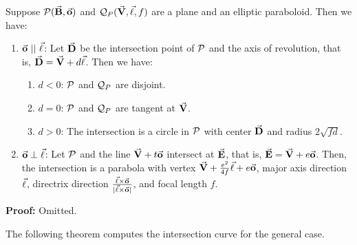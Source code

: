 \begin{lemma}
\label{lemma:para-para&perp}
     Suppose ${\cal P}(\vec{\bf B},\vec{\bf o})$ and
${\cal Q}_P(\vec{\bf V},\vec{\bf \ell},f)$ are a plane and an elliptic paraboloid.
Then we have:
\begin{enumerate}
     \item $\vec{\bf o}\ ||\ \vec{\bf \ell}$:  Let $\vec{\bf D}$ be the intersection
          point of ${\cal P}$ and the axis of revolution, that is,
          $\vec{\bf D}=\vec{\bf V}+d\vec{\bf \ell}$.  Then we have:
     \begin{enumerate}
          \item $d<0$: ${\cal P}$ and ${\cal Q}_P$ are disjoint.
          \item $d=0$: ${\cal P}$ and ${\cal Q}_P$ are tangent at $\vec{\bf V}$.
          \item $d>0$: The intersection is a circle in ${\cal P}$ with center 
               $\vec{\bf D}$ and radius $2\sqrt{fd}$.
     \end{enumerate}
     \item $\vec{\bf o}\perp\vec{\bf \ell}$: Let ${\cal P}$ and the line
          $\vec{\bf V}+t\vec{\bf o}$ intersect at $\vec{\bf E}$, that is,
          $\vec{\bf E}=\vec{\bf V}+e\vec{\bf o}$.  Then, the intersection
          is a parabola with vertex 
          $\vec{\bf V}+\frac{e^2}{4f}\vec{\bf \ell}+e\vec{\bf o}$, major axis 
          direction $\vec{\bf \ell}$, directrix direction 
          $\frac{\vec{\bf \ell}\times\vec{\bf o}}{|\vec{\bf \ell}\times\vec{\bf o}|}$,
          and focal length $f$.
\end{enumerate}
\end{lemma}
{\bf Proof:} Omitted. \QED

     The following theorem computes the intersection curve for the 
general case.

